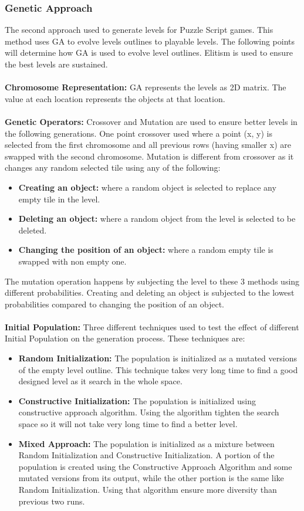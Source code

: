 \subsubsection{Genetic Approach}
The second approach used to generate levels for Puzzle Script games. This method uses GA to evolve levels outlines to playable levels. The following points will determine how GA is used to evolve level outlines. Elitism is used to ensure the best levels are sustained.\\\\
\textbf{Chromosome Representation:} GA represents the levels as 2D matrix. The value at each location represents the objects at that location.\\\\
\textbf{Genetic Operators:} Crossover and Mutation are used to ensure better levels in the following generations. One point crossover used where a point (x, y) is selected from the first chromosome and all previous rows (having smaller x) are swapped with the second chromosome. Mutation is different from crossover as it changes any random selected tile using any of the following:
\begin{itemize} \itemsep0pt \parskip0pt 
	\item \textbf{Creating an object:} where a random object is selected to replace any empty tile in the level.
	\item \textbf{Deleting an object:} where a random object from the level is selected to be deleted.
	\item \textbf{Changing the position of an object:} where a random empty tile is swapped with non empty one.
\end{itemize}
The mutation operation happens by subjecting the level to these 3 methods using different probabilities. Creating and deleting an object is subjected to the lowest probabilities compared to changing the position of an object.\\\\
\textbf{Initial Population:} Three different techniques used to test the effect of different Initial Population on the generation process. These techniques are:
\begin{itemize} \itemsep0pt \parskip0pt 
	\item \textbf{Random Initialization:} The population is initialized as a mutated versions of the empty level outline. This technique takes very long time to find a good designed level as it search in the whole space.
	\item \textbf{Constructive Initialization:} The population is initialized using constructive approach algorithm. Using the algorithm tighten the search space so it will not take very long time to find a better level.
	\item \textbf{Mixed Approach:} The population is initialized as a mixture between Random Initialization and Constructive Initialization. A portion of the population is created using the Constructive Approach Algorithm and some mutated versions from its output, while the other portion is the same like Random Initialization. Using that algorithm ensure more diversity than previous two runs.
\end{itemize}

